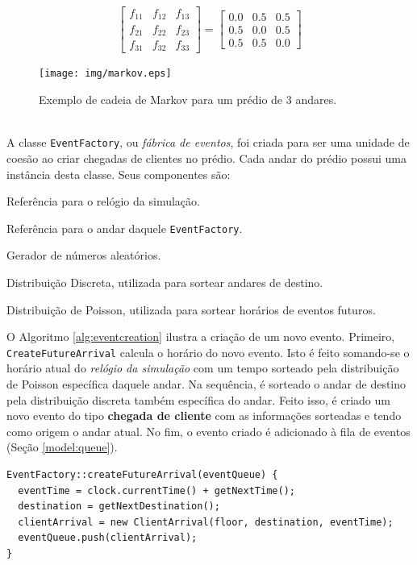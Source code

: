 \begin{description}
\[
  \begin{bmatrix}
    f_{11} & f_{12} & f_{13}  \\
    f_{21} & f_{22} & f_{23}  \\
    f_{31} & f_{32} & f_{33}
  \end{bmatrix} = \begin{bmatrix}
    0.0 & 0.5 & 0.5  \\
    0.5 & 0.0 & 0.5  \\
    0.5 & 0.5 & 0.0
  \end{bmatrix}
\]

\begin{figure}[htb!]
  \centering
  \texttt{[image: img/markov.eps]}
  \caption{Exemplo de cadeia de Markov para um prédio de 3 andares.}
\label{fig:distribution:markov}
\end{figure}

\item[EventFactory] \label{model:eventfactory} \hfill \\
A classe \texttt{EventFactory}, ou \textit{fábrica de eventos}, foi criada para
ser uma unidade de coesão ao criar chegadas de clientes no prédio. Cada andar do
prédio possui uma instância desta classe. Seus componentes são:

  \begin{description}[leftmargin=!,labelwidth=\widthof{\bfseries hasNextEvent}]\setlength\itemsep{0mm}
    \item[\texttt{clock}] Referência para o relógio da simulação.
    \item[\texttt{floor}] Referência para o andar daquele \texttt{EventFactory}.
    \item[\texttt{random engine}] Gerador de números aleatórios.
    \item[\texttt{destination}] Distribuição Discreta, utilizada para sortear andares de destino.
    \item[\texttt{arrival}] Distribuição de Poisson, utilizada para sortear horários de eventos futuros.
  \end{description}

  O Algoritmo \ref{alg:eventcreation} ilustra a criação de um novo evento.
  Primeiro, \texttt{CreateFutureArrival} calcula o horário do novo evento. Isto
  é feito somando-se o horário atual do \textit{relógio da simulação} com um
  tempo sorteado pela distribuição de Poisson específica daquele andar. Na
  sequência, é sorteado o andar de destino pela distribuição discreta também
  específica do andar. Feito isso, é criado um novo evento do tipo
  \textbf{chegada de cliente} com as informações sorteadas e tendo como origem o
  andar atual. No fim, o evento criado é adicionado à fila de eventos (Seção
  \ref{model:queue}).
    \begin{algorithm}[htb!]
      \centering
        \begin{verbatim}
EventFactory::createFutureArrival(eventQueue) {
  eventTime = clock.currentTime() + getNextTime();
  destination = getNextDestination();
  clientArrival = new ClientArrival(floor, destination, eventTime);
  eventQueue.push(clientArrival);
}


\end{verbatim}
\end{algorithm}
\end{description}
